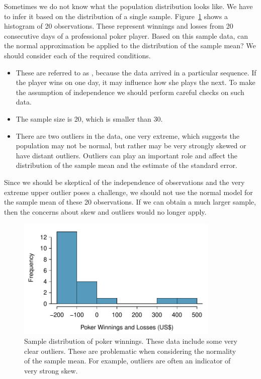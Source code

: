 \begin{example}{Sometimes we do not know what the population distribution looks like.  We have to infer it based on the distribution of a single sample.  Figure~\ref{pokerProfitsCanApplyNormalToSampMean} shows a histogram of 20 observations. These represent winnings and losses from 20 consecutive days of a professional poker player. Based on this sample data, can the normal approximation be applied to the distribution of the sample mean?}
We should consider each of the required conditions.
\begin{itemize}
\setlength{\itemsep}{0mm}
\item[(1)] These are referred to as , because the data arrived in a particular sequence. If the player wins on one day, it may influence how she plays the next. To make the assumption of independence we should perform careful checks on such data. 
\item[(2)] The sample size is 20, which is smaller than 30.
\item[(3)] There are two outliers in the data, one very extreme, which suggests the population may not be normal, but rather may be very strongly skewed or have distant outliers.  Outliers can play an important role and affect the distribution of the sample mean and the estimate of the standard error.
\end{itemize}
Since we should be skeptical of the independence of observations and the very extreme upper outlier poses a challenge, we should not use the normal model for the sample mean of these 20 observations. If we can obtain a much larger sample,  then the concerns about skew and outliers would no longer apply.
\end{example}

\begin{figure}[ht]
   \centering
   \includegraphics[height=58mm]{ch_distributions/figures/pokerProfitsCanApplyNormalToSampMean/pokerProfitsCanApplyNormalToSampMean}
   \caption{Sample distribution of poker winnings. These data include some very clear outliers. These are problematic when considering the normality of the sample mean. For example, outliers are often an indicator of very strong skew.}
   \label{pokerProfitsCanApplyNormalToSampMean}
\end{figure}

